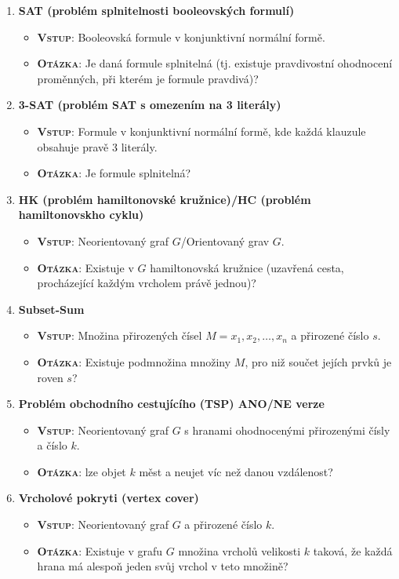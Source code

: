 \begin{enumerate}
\begin{itemize}
	\end{itemize}
	\item \textbf{SAT (problém splnitelnosti booleovských formulí)}
	\begin{itemize}
		\item \textbf{\textsc{Vstup}}: Booleovská formule v konjunktivní normální formě.
		\item \textbf{\textsc{Otázka}}: Je daná formule splnitelná (tj. existuje pravdivostní ohodnocení proměnných, při kterém je formule pravdivá)?
	\end{itemize}
	\item \textbf{3-SAT (problém SAT s omezením na 3 literály)}
	\begin{itemize}
		\item \textbf{\textsc{Vstup}}: Formule v konjunktivní normální formě, kde každá klauzule obsahuje pravě 3 literály.
		\item \textbf{\textsc{Otázka}}: Je formule splnitelná?
	\end{itemize}
	\item \textbf{HK (problém hamiltonovské kružnice)/HC (problém hamiltonovskho cyklu) }
	\begin{itemize}
		\item \textbf{\textsc{Vstup}}: Neorientovaný graf $ G $/Orientovaný grav $ G $.
		\item \textbf{\textsc{Otázka}}: Existuje v $ G $ hamiltonovská kružnice (uzavřená cesta, procházející každým vrcholem právě jednou)?
	\end{itemize}
	\item \textbf{Subset-Sum}
	\begin{itemize}
		\item \textbf{\textsc{Vstup}}: Množina přirozených čísel $ M = {x_1, x_2, \ldots, x_n} $ a přirozené číslo $ s $.
		\item \textbf{\textsc{Otázka}}: Existuje podmnožina množiny $ M $, pro niž součet jejích prvků je roven $ s $?
	\end{itemize}
	\item \textbf{Problém obchodního cestujícího (TSP) ANO/NE verze}
	\begin{itemize}
		\item \textbf{\textsc{Vstup}}: Neorientovaný graf $ G $ s hranami ohodnocenými přirozenými čísly a číslo $ k $.
		\item \textbf{\textsc{Otázka}}: lze objet $k$ měst a neujet víc než danou vzdálenost?
	\end{itemize}
	\item \textbf{Vrcholové pokryti (vertex cover)}
	\begin{itemize}
		\item \textbf{\textsc{Vstup}}: Neorientovaný graf $ G $ a přirozené číslo $ k $.
		\item \textbf{\textsc{Otázka}}: Existuje v grafu $ G $ množina vrcholů velikosti $ k $ taková, že každá hrana má alespoň jeden svůj vrchol v teto množině?
	\end{itemize}
\end{enumerate}